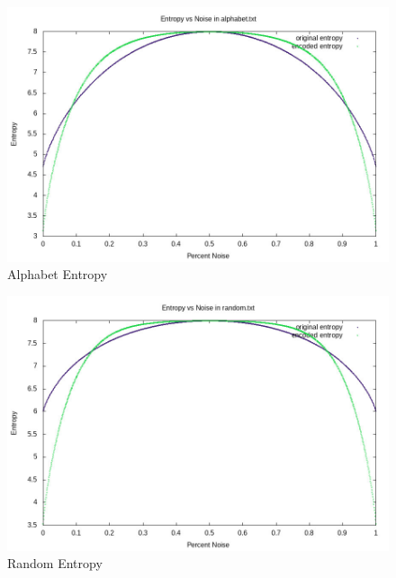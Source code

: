 \documentclass[12pt]{article}
\begin{document}
\begin{figure}[H]
    \caption{Alphabet Entropy}\label{alphabet_entropy}
    \includegraphics[width=6in]{alphabet.txt.entropy.jpg}
    \centering
\end{figure}

\begin{figure}[H]
    \caption{Random Entropy}\label{random_entropy}
    \includegraphics[width=6in]{random.txt.entropy.jpg}
    \centering
\end{figure}
\end{document}

